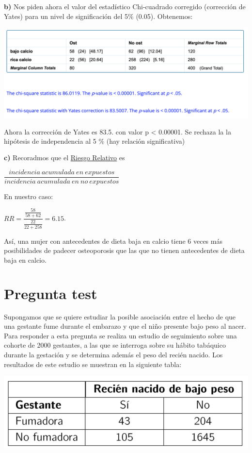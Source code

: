 \documentclass[
]{book}
\begin{document}
\textbf{b)} Nos piden ahora el valor del estadístico Chi-cuadrado corregido (corrección de Yates) para un nivel de significación del 5\% (0.05). Obtenemos:

\includegraphics[width=20.28in]{img/5_2}

Ahora la corrección de Yates es 83.5. con valor p \textless{} 0.00001. Se rechaza la la hipótesis de independencia al 5 \% (hay relación significativa)

\textbf{c)} Recoradmos que el \href{https://es.wikipedia.org/wiki/Riesgo_relativo}{Riesgo Relativo} es

\(\dfrac{incidencia ~ acumulada ~ en ~ expuestos}{incidencia ~ acumulada ~ en ~ no ~ expuestos}\)

En nuestro caso:

\(RR = \dfrac{\frac{58}{58+62}}{\frac{22}{22+258}}= 6.15\).

Así, una mujer con antecedentes de dieta baja en calcio tiene 6 veces más posibilidades de padecer osteoporosis que las que no tienen antecedentes de dieta baja en calcio.

\hypertarget{pregunta-test-151}{%
\section{Pregunta test}\label{pregunta-test-151}}

Supongamos que se quiere estudiar la posible asociación entre el hecho de que una gestante fume durante el embarazo y que el niño presente bajo peso al nacer. Para responder a esta pregunta se realiza un estudio de seguimiento sobre una cohorte de 2000 gestantes, a las que se interroga sobre su hábito tabáquico durante la gestación y se determina además el peso del recién nacido. Los resultados de este estudio se muestran en la siguiente tabla:

\includegraphics[width=13.08in]{img/5_3}
\end{document}
